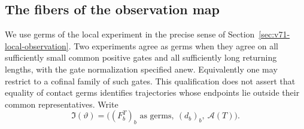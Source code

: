 \subsection{The fibers of the observation map}

We use germs of the local experiment in the precise sense of
Section~\ref{sec:v71-local-observation}.  Two experiments agree as germs
when they agree on all sufficiently small common positive gates and all
sufficiently long returning lengths, with the gate normalization specified
anew.  Equivalently one may restrict to a cofinal family of such gates.
This qualification does not assert that equality of contact germs identifies
trajectories whose endpoints lie outside their common representatives.
Write
\[
 \mathfrak I(\vartheta)=
    \bigl((F_b^T)_b\text{ as germs},\ (d_b)_b,\ \mathcal A(T)\bigr).
\]

